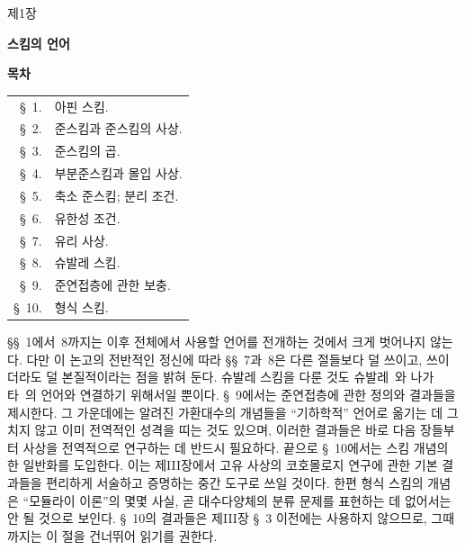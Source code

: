 \clearpage
{}
\label{chapter:I-ko}

\begin{center}
{\large 제1장\par}
\vspace{1.5em}
{\Large\bfseries 스킴의 언어\par}
\vspace{1.8em}
{\bfseries 목차\par}
\end{center}

\medskip
\begin{tabular}{@{}r@{\ }l@{}}
\S~1.  & 아핀 스킴.\\
\S~2.  & 준스킴과 준스킴의 사상.\\
\S~3.  & 준스킴의 곱.\\
\S~4.  & 부분준스킴과 몰입 사상.\\
\S~5.  & 축소 준스킴; 분리 조건.\\
\S~6.  & 유한성 조건.\\
\S~7.  & 유리 사상.\\
\S~8.  & 슈발레 스킴.\\
\S~9.  & 준연접층에 관한 보충.\\
\S~10. & 형식 스킴.
\end{tabular}

\medskip
\S\S~1에서~8까지는 이후 전체에서 사용할 언어를 전개하는 것에서
크게 벗어나지 않는다. 다만 이 논고의 전반적인 정신에 따라
\S\S~7과~8은 다른 절들보다 덜 쓰이고, 쓰이더라도 덜 본질적이라는
점을 밝혀 둔다. 슈발레 스킴을 다룬 것도 슈발레~\cite{I-1}와
나가타~\cite{I-9}의 언어와 연결하기 위해서일 뿐이다. \S~9에서는
준연접층에 관한 정의와 결과들을 제시한다. 그 가운데에는 알려진
가환대수의 개념들을 ``기하학적'' 언어로 옮기는 데 그치지 않고 이미
전역적인 성격을 띠는 것도 있으며, 이러한 결과들은 바로 다음 장들부터
사상을 전역적으로 연구하는 데 반드시 필요하다. 끝으로 \S~10에서는
스킴 개념의 한 일반화를 도입한다. 이는 제III장에서 고유 사상의 코호몰로지
연구에 관한 기본 결과들을 편리하게 서술하고 증명하는 중간 도구로 쓰일
것이다. 한편 형식 스킴의 개념은 ``모듈라이 이론''의 몇몇 사실, 곧
대수다양체의 분류 문제를 표현하는 데 없어서는 안 될 것으로 보인다.
\S~10의 결과들은 제III장 \S~3 이전에는 사용하지 않으므로, 그때까지는
이 절을 건너뛰어 읽기를 권한다.

\clearpage
